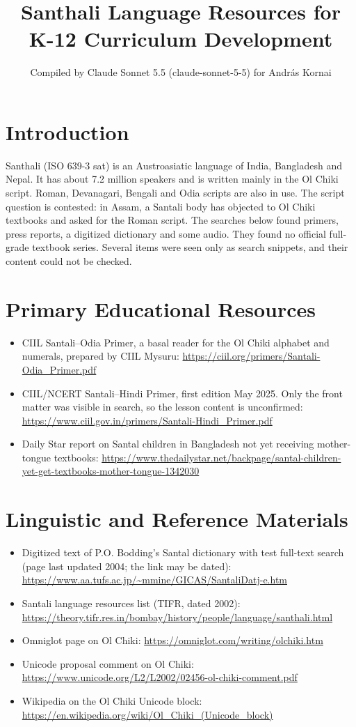 \documentclass[12pt]{article}
\title{Santhali Language Resources for K-12 Curriculum Development}
\author{Compiled by Claude Sonnet 5.5 (claude-sonnet-5-5) for Andr\'as Kornai}
\date{}
\begin{document}
\maketitle

\section{Introduction}
Santhali (ISO 639-3 sat) is an Austroasiatic language of India, Bangladesh and Nepal. It has about 7.2 million speakers and is written mainly in the Ol Chiki script. Roman, Devanagari, Bengali and Odia scripts are also in use. The script question is contested: in Assam, a Santali body has objected to Ol Chiki textbooks and asked for the Roman script. The searches below found primers, press reports, a digitized dictionary and some audio. They found no official full-grade textbook series. Several items were seen only as search snippets, and their content could not be checked.

\section{Primary Educational Resources}
\begin{itemize}
\item CIIL Santali--Odia Primer, a basal reader for the Ol Chiki alphabet and numerals, prepared by CIIL Mysuru: \url{https://ciil.org/primers/Santali-Odia_Primer.pdf}
\item CIIL/NCERT Santali--Hindi Primer, first edition May 2025. Only the front matter was visible in search, so the lesson content is unconfirmed: \url{https://www.ciil.gov.in/primers/Santali-Hindi_Primer.pdf}
\item Daily Star report on Santal children in Bangladesh not yet receiving mother-tongue textbooks: \url{https://www.thedailystar.net/backpage/santal-children-yet-get-textbooks-mother-tongue-1342030}
\end{itemize}

\section{Linguistic and Reference Materials}
\begin{itemize}
\item Digitized text of P.O. Bodding's Santal dictionary with test full-text search (page last updated 2004; the link may be dated): \url{https://www.aa.tufs.ac.jp/~mmine/GICAS/SantaliDatj-e.htm}
\item Santali language resources list (TIFR, dated 2002): \url{https://theory.tifr.res.in/bombay/history/people/language/santhali.html}
\item Omniglot page on Ol Chiki: \url{https://omniglot.com/writing/olchiki.htm}
\item Unicode proposal comment on Ol Chiki: \url{https://www.unicode.org/L2/L2002/02456-ol-chiki-comment.pdf}
\item Wikipedia on the Ol Chiki Unicode block: \url{https://en.wikipedia.org/wiki/Ol_Chiki_(Unicode_block)}
\end{itemize}
\end{document}

